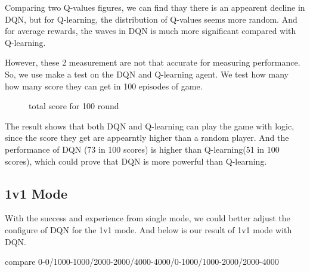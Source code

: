 \documentclass[12pt]{article}
\begin{document}
Comparing two Q-values figures, we can find thay there is an appearent decline in DQN, but for Q-learning, the distribution of Q-values seems more random. And for average rewards, the waves in DQN is much more significant compared with Q-learning.

However, these 2 measurement are not that accurate for measuring performance. So, we use make a test on the DQN and Q-learning agent. We test how many how many score they can get in 100 episodes of game.

\begin{figure}[htbp]
	\centering
	\caption{total score for 100 round}
\end{figure}

 The result shows that both DQN and Q-learning can play the game with logic, since the score they get are appearntly higher than a random player. And the performance of DQN (73 in 100 scores) is higher than Q-learning(51 in 100 scores), which could prove that DQN is more powerful than Q-learning.


\subsection{1v1 Mode}

With the success and experience from single mode, we could better adjust the configure of DQN for the 1v1 mode. And below is our result of 1v1 mode with DQN.

compare 0-0/1000-1000/2000-2000/4000-4000/0-1000/1000-2000/2000-4000
\end{document}
